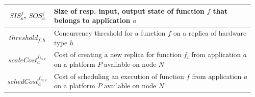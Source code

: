 \begin{table}[t]
\begin{center}
{\begin{tabularx}{\linewidth}{|c|Y|}
    $SIS^{f}_{a}$, $SOS^{f}_{a}$ & Size of resp. input, output state of function $f$ that belongs to application $a$ \\ \hline
    $threshold_{f, h}$ & Concurrency threshold for a function $f$ on a replica of hardware type $h$ \\ \hline
    $scaleCost^{{f}_{{i}_{N, P}}}_a$ & Cost of creating a new replica for function $f_i$ from application $a$ on a platform $P$ available on node $N$ \\ \hline
    $schedCost^{{f}_{{i}_{N, P}}}_a$ & Cost of scheduling an execution of function $f$ from application $a$ on a platform $P$ available on node $N$ \\ \hline
    \end{tabularx}}
    \label{table:herocache-notation}
    \end{center}
\end{table}






